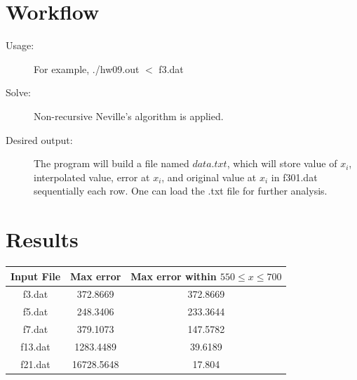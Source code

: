 \documentclass[12pt,a4paper]{article}
\begin{document}
\section{Workflow}

\begin{description}  

\item [Usage:] For example,  ./hw09.out $<$ f3.dat
\item [Solve:] Non-recursive Neville's algorithm is applied.
\item[Desired output:] The program will build a file named $data.txt$, which will store value of $x_i$, interpolated value, error at $x_i$, and original value at $x_i$ in f301.dat sequentially each row. One can load the .txt file for further analysis.
\end{description}

\section{Results}
  \begin{center}
    \begin{tabular}{|c|c|c|}
    \hline  Input File & Max error & Max error within $550 \le x \le 700$  \\
    \hline  f3.dat	&372.8669    	&372.8669	\\
    \hline  f5.dat	&248.3406    	&233.3644	\\
    \hline  f7.dat	&379.1073    	&147.5782	\\
    \hline  f13.dat	&1283.4489 	&39.6189	\\
    \hline  f21.dat	&16728.5648	& 17.804	\\\hline
 \end{tabular}

 \end{center}
\end{document}
